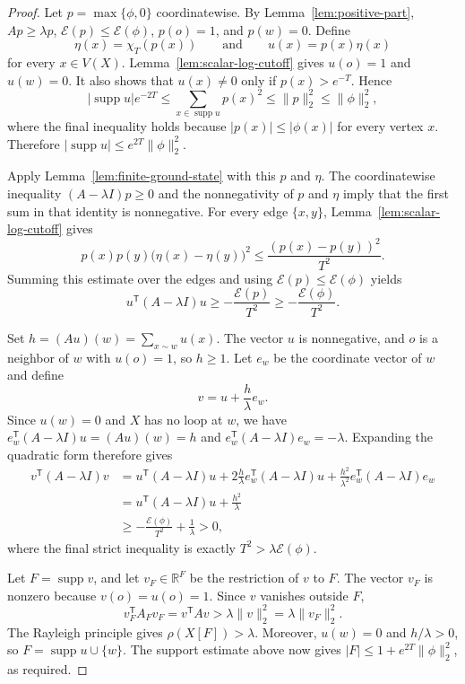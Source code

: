 \documentclass[11pt]{article}
\theoremstyle{definition}
\theoremstyle{remark}
\begin{document}
\begin{proof}
Let $p=\max\{\phi,0\}$ coordinatewise. By Lemma~\ref{lem:positive-part}, $Ap\geq\lambda p$, $\mathcal E(p)\leq\mathcal E(\phi)$, $p(o)=1$, and $p(w)=0$. Define
\[
\eta(x)=\chi_T(p(x))
\qquad\text{and}\qquad
u(x)=p(x)\eta(x)
\]
for every $x\in V(X)$. Lemma~\ref{lem:scalar-log-cutoff} gives $u(o)=1$ and $u(w)=0$. It also shows that $u(x)\neq0$ only if $p(x)>e^{-T}$. Hence
\[
|\operatorname{supp}u|e^{-2T}\leq\sum_{x\in\operatorname{supp}u}p(x)^2\leq\|p\|_2^2\leq\|\phi\|_2^2,
\]
where the final inequality holds because $|p(x)|\leq|\phi(x)|$ for every vertex $x$. Therefore $|\operatorname{supp}u|\leq e^{2T}\|\phi\|_2^2$.

Apply Lemma~\ref{lem:finite-ground-state} with this $p$ and $\eta$. The coordinatewise inequality $(A-\lambda I)p\geq0$ and the nonnegativity of $p$ and $\eta$ imply that the first sum in that identity is nonnegative. For every edge $\{x,y\}$, Lemma~\ref{lem:scalar-log-cutoff} gives
\[
p(x)p(y)\bigl(\eta(x)-\eta(y)\bigr)^2\leq\frac{(p(x)-p(y))^2}{T^2}.
\]
Summing this estimate over the edges and using $\mathcal E(p)\leq\mathcal E(\phi)$ yields
\[
u^{\mathsf T}(A-\lambda I)u\geq-\frac{\mathcal E(p)}{T^2}\geq-\frac{\mathcal E(\phi)}{T^2}.
\]

Set $h=(Au)(w)=\sum_{x\sim w}u(x)$. The vector $u$ is nonnegative, and $o$ is a neighbor of $w$ with $u(o)=1$, so $h\geq1$. Let $e_w$ be the coordinate vector of $w$ and define
\[
v=u+\frac{h}{\lambda}e_w.
\]
Since $u(w)=0$ and $X$ has no loop at $w$, we have $e_w^{\mathsf T}(A-\lambda I)u=(Au)(w)=h$ and $e_w^{\mathsf T}(A-\lambda I)e_w=-\lambda$. Expanding the quadratic form therefore gives
\[
\begin{aligned}
v^{\mathsf T}(A-\lambda I)v
&=u^{\mathsf T}(A-\lambda I)u+2\frac{h}{\lambda}e_w^{\mathsf T}(A-\lambda I)u+\frac{h^2}{\lambda^2}e_w^{\mathsf T}(A-\lambda I)e_w\\
&=u^{\mathsf T}(A-\lambda I)u+\frac{h^2}{\lambda}\\
&\geq-\frac{\mathcal E(\phi)}{T^2}+\frac{1}{\lambda}>0,
\end{aligned}
\]
where the final strict inequality is exactly $T^2>\lambda\mathcal E(\phi)$.

Let $F=\operatorname{supp}v$, and let $v_F\in\mathbb R^F$ be the restriction of $v$ to $F$. The vector $v_F$ is nonzero because $v(o)=u(o)=1$. Since $v$ vanishes outside $F$,
\[
v_F^{\mathsf T}A_Fv_F=v^{\mathsf T}Av>\lambda\|v\|_2^2=\lambda\|v_F\|_2^2.
\]
The Rayleigh principle gives $\rho(X[F])>\lambda$. Moreover, $u(w)=0$ and $h/\lambda>0$, so $F=\operatorname{supp}u\cup\{w\}$. The support estimate above now gives $|F|\leq1+e^{2T}\|\phi\|_2^2$, as required.
\end{proof}
\end{document}
